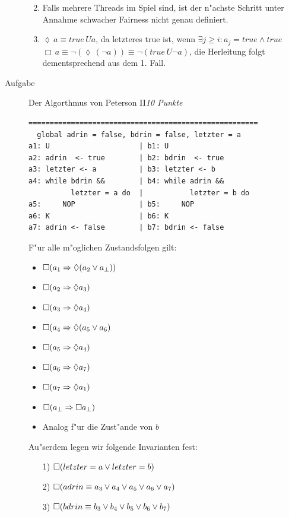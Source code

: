 \documentclass[a4paper,twoside,12pt]{article}
\newcounter{AUFGNR}
\newcommand{\AUFGABE}[2]{\vspace{0.3cm}\item[Aufgabe~\arabic{AUFGNR}]\stepcounter{AUFGNR} #1\hfill\emph{#2}}
\begin{document}
\begin{description}
\begin{enumerate}
\begin{enumerate}
\end{enumerate}

\item
Falls mehrere Threads im Spiel sind, ist der n"achste Schritt unter Annahme schwacher Fairness nicht genau definiert.

\item
$ \lozenge\, a \equiv true\, Ua$, da letzteres true ist, wenn $\exists j\geq i: a_j = true \land true $\\

$ \Box\, a \equiv \neg (\lozenge\, (\neg a)) \equiv \neg (true\, U\neg a)$, die Herleitung folgt dementsprechend aus dem 1. Fall.\\

\end{enumerate}

\AUFGABE{Der Algorthmus von Peterson II}{10 Punkte}
\begin{verbatim}
======================================================
  global adrin = false, bdrin = false, letzter = a
a1: U                     | b1: U
a2: adrin  <- true        | b2: bdrin  <- true
a3: letzter <- a          | b3: letzter <- b
a4: while bdrin &&        | b4: while adrin &&
          letzter = a do  |           letzter = b do
a5:     NOP               | b5:     NOP
a6: K                     | b6: K
a7: adrin <- false        | b7: bdrin <- false
\end{verbatim}
F"ur alle m"oglichen Zustandsfolgen gilt:
\begin{itemize}
	\item $\Box(a_1 \Rightarrow \lozenge (a_2 \vee a_\bot))$
	\item $\Box(a_2 \Rightarrow \lozenge a_3)$
	\item $\Box(a_3 \Rightarrow \lozenge a_4)$
	\item $\Box(a_4 \Rightarrow \lozenge (a_5 \vee a_6)$
	\item $\Box(a_5 \Rightarrow \lozenge a_4)$
	\item $\Box(a_6 \Rightarrow \lozenge a_7)$
	\item $\Box(a_7 \Rightarrow \lozenge a_1)$
	\item $\Box(a_\bot \Rightarrow \Box a_\bot)$
	\item Analog f"ur die Zust"ande von $b$
\end{itemize}

Au"serdem legen wir folgende Invarianten fest:
\begin{enumerate}
	\item[1)] $\Box(letzter = a \vee letzter = b)$
	\item[2)] $\Box(adrin \equiv a_3 \vee a_4 \vee a_5 \vee a_6 \vee a_7)$
	\item[3)] $\Box(bdrin \equiv b_3 \vee b_4 \vee b_5 \vee b_6 \vee b_7)$
\end{enumerate}


\end{description}
\end{document}
